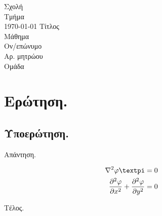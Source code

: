 \documentclass[11pt,a4paper]{article}
\providecommand*{\pd}[3][]{\frac{\partial^{#1}#2}{\partial #3^{#1}}}
\begin{document}
\renewcommand{\thesubsection}{{}(\alph{subsection})}

\makeatletter
\renewrobustcmd{\anw@true}{\let\ifanw@\iftrue}
\renewrobustcmd{\anw@false}{\let\ifanw@\iffalse}\anw@false
\newrobustcmd{\noanw@true}{\let\ifnoanw@\iftrue}
\newrobustcmd{\noanw@false}{\let\ifnoanw@\iffalse}\noanw@false
\renewrobustcmd{\anw@print}{\ifanw@\ifnoanw@\else\numer@lsign\fi\fi}
\newrobustcmd{\noanw}{\noanw@true}
\makeatother


\addto\captionsgreek{
	\renewcommand{\figurename}{Διάγραμμα}
    \renewcommand{\bibname}{Βιβλιογραφία}
    \renewcommand{\refname}{Βιβλιογραφία}
}

\begin{titlepage}
\centering
Σχολή \\
Τμήμα \\
\today
\vfill
\vfill
{\huge Τίτλος \\}
{\Large Μάθημα \\}
\vfill
Ον/επώνυμο \\
Αρ. μητρώου \\
Ομάδα
\vfill
\vfill
\end{titlepage}


\section{Ερώτηση.}

\subsection{Υποερώτηση.}

Απάντηση.

\begin{align*}
    \displaystyle %
    \nabla^2\varphi \textpi                 &= 0 \\
    \pd[2]{\varphi}{x} + \pd[2]{\varphi}{y} &= 0
\end{align*}

Τέλος.



\end{document}
